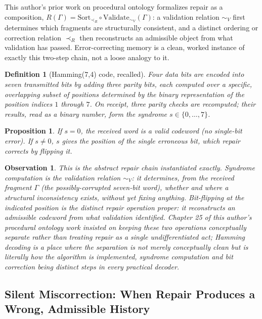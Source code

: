 \documentclass[12pt]{article}
\newtheorem{definition}{Definition}
\newtheorem{proposition}{Proposition}
\newtheorem{observation}{Observation}
\begin{document}
This author's prior work on procedural ontology formalizes repair as a composition, $R(\Gamma) = \text{Sort}_{\prec_R} \circ \text{Validate}_{\sim_V}(\Gamma)$: a validation relation $\sim_V$ first determines which fragments are structurally consistent, and a distinct ordering or correction relation $\prec_R$ then reconstructs an admissible object from what validation has passed. Error-correcting memory is a clean, worked instance of exactly this two-step chain, not a loose analogy to it.

\begin{definition}[Hamming(7,4) code, recalled]
Four data bits are encoded into seven transmitted bits by adding three parity bits, each computed over a specific, overlapping subset of positions determined by the binary representation of the position indices $1$ through $7$. On receipt, three parity checks are recomputed; their results, read as a binary number, form the syndrome $s \in \{0,\dots,7\}$.
\end{definition}

\begin{proposition}
If $s = 0$, the received word is a valid codeword (no single-bit error). If $s \neq 0$, $s$ gives the position of the single erroneous bit, which repair corrects by flipping it.
\end{proposition}

\begin{observation}
This is the abstract repair chain instantiated exactly. Syndrome computation is the validation relation $\sim_V$: it determines, from the received fragment $\Gamma$ (the possibly-corrupted seven-bit word), whether and where a structural inconsistency exists, without yet fixing anything. Bit-flipping at the indicated position is the distinct repair operation proper: it reconstructs an admissible codeword from what validation identified. Chapter 25 of this author's procedural ontology work insisted on keeping these two operations conceptually separate rather than treating repair as a single undifferentiated act; Hamming decoding is a place where the separation is not merely conceptually clean but is literally how the algorithm is implemented, syndrome computation and bit correction being distinct steps in every practical decoder.
\end{observation}

\subsection{Silent Miscorrection: When Repair Produces a Wrong, Admissible History}
\end{document}
